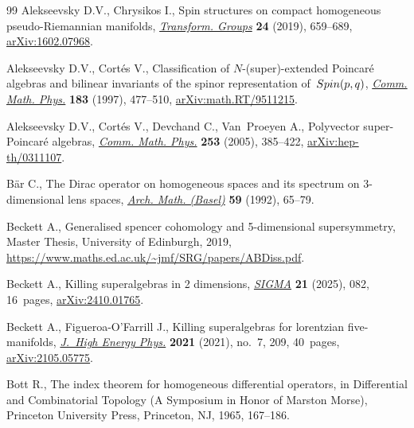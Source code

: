 \documentclass[11pt]{article}
\numberwithin{equation}{section}
\numberwithin{equation}{section}
\newcommand{\1}{\mathbbm{1}}
\begin{document}
\begin{thebibliography}{99}
Alekseevsky D.V., Chrysikos I., Spin structures on compact homogeneous
 pseudo-{R}iemannian manifolds,
 \href{https://doi.org/10.1007/s00031-018-9498-1}{\textit{Transform. Groups}}
 \textbf{24} (2019), 659--689,
 \href{http://arxiv.org/abs/1602.07968}{arXiv:1602.07968}.

Alekseevsky D.V., Cort\'es V., Classification of {$N$}-(super)-extended
 {P}oincar\'e algebras and bilinear invariants of the spinor representation
 of~{${\rm Spin}(p,q)$},
 \href{https://doi.org/10.1007/s002200050039}{\textit{Comm. Math. Phys.}}
 \textbf{183} (1997), 477--510,
 \href{http://arxiv.org/abs/math.RT/9511215}{arXiv:math.RT/9511215}.

Alekseevsky D.V., Cort\'es V., Devchand C., Van~Proeyen A., Polyvector
 super-{P}oincar\'e algebras,
 \href{https://doi.org/10.1007/s00220-004-1155-y}{\textit{Comm. Math. Phys.}}
 \textbf{253} (2005), 385--422,
 \href{http://arxiv.org/abs/hep-th/0311107}{arXiv:hep-th/0311107}.

B\"ar C., The {D}irac operator on homogeneous spaces and its spectrum on
 {$3$}-dimensional lens spaces,
 \href{https://doi.org/10.1007/BF01199016}{\textit{Arch. Math. (Basel)}}
 \textbf{59} (1992), 65--79.

Beckett A., Generalised spencer cohomology and 5-dimensional supersymmetry,
 {M}aster Thesis, {U}niversity of Edinburgh, 2019,
 \url{https://www.maths.ed.ac.uk/~jmf/SRG/papers/ABDiss.pdf}.

Beckett A., Killing superalgebras in 2 dimensions,
 \href{https://doi.org/10.3842/SIGMA.2025.082}{\textit{SIGMA}} \textbf{21}
 (2025), 082, 16~pages,
 \href{http://arxiv.org/abs/2410.01765}{arXiv:2410.01765}.

Beckett A., Figueroa-O'Farrill J., Killing superalgebras for lorentzian
 five-manifolds,
 \href{https://doi.org/10.1007/jhep07(2021)209}{\textit{J.~High Energy Phys.}}
 \textbf{2021} (2021), no.~7, 209, 40~pages,
 \href{http://arxiv.org/abs/2105.05775}{arXiv:2105.05775}.

Bott R., The index theorem for homogeneous differential operators, in
 Differential and {C}ombinatorial {T}opology ({A} {S}ymposium in {H}onor of
 {M}arston {M}orse), Princeton University Press, Princeton, NJ, 1965,
 167--186.


\end{thebibliography}
\end{document}
